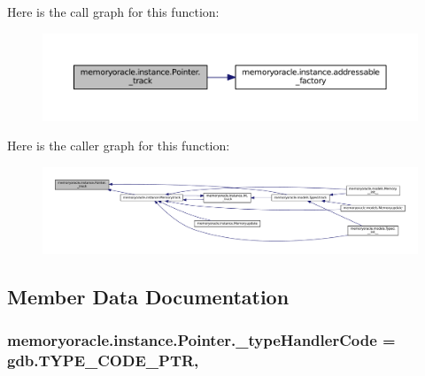 Here is the call graph for this function\+:
\nopagebreak
\begin{figure}[H]
\begin{center}
\leavevmode
\includegraphics[width=350pt]{classmemoryoracle_1_1instance_1_1Pointer_a2cc9e298adaad8bed089d90186fcde8a_cgraph}
\end{center}
\end{figure}




Here is the caller graph for this function\+:
\nopagebreak
\begin{figure}[H]
\begin{center}
\leavevmode
\includegraphics[width=350pt]{classmemoryoracle_1_1instance_1_1Pointer_a2cc9e298adaad8bed089d90186fcde8a_icgraph}
\end{center}
\end{figure}




\subsection{Member Data Documentation}
\hypertarget{classmemoryoracle_1_1instance_1_1Pointer_a9668f3c920788f907283902e134de2b1}{}
\subsubsection[{\+\_\+type\+Handler\+Code}]{\setlength{\rightskip}{0pt plus 5cm}memoryoracle.\+instance.\+Pointer.\+\_\+type\+Handler\+Code = gdb.\+T\+Y\+P\+E\+\_\+\+C\+O\+D\+E\+\_\+\+P\+T\+R\hspace{0.3cm}{\ttfamily [static]}, {\ttfamily [private]}}\label{classmemoryoracle_1_1instance_1_1Pointer_a9668f3c920788f907283902e134de2b1}



